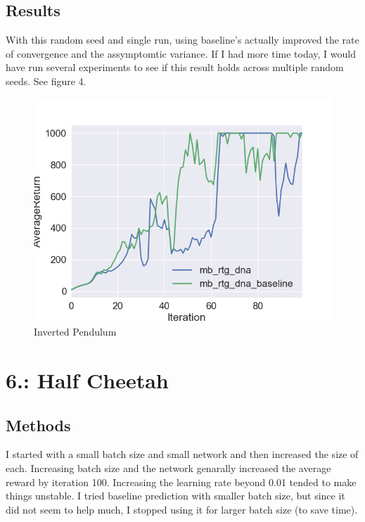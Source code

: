 \documentclass{article}\usepackage[]{graphicx}\usepackage[]{color}
\begin{document}
\subsection*{Results}

With this random seed and single run, using baseline's actually improved the rate of convergence and the assymptomtic variance. If I had more time today, I would have run several experiments to see if this result holds across multiple random seeds. See figure 4.

\begin{figure}
  \includegraphics[width=\linewidth]{figures/inverted_pendulum_baseline_exp.png}
  \caption{Inverted Pendulum}
  \label{pendulumas}
\end{figure}

\section*{6.: Half Cheetah}

\subsection*{Methods}

I started with a small batch size and small network and then increased the size of each. Increasing batch size and the network genarally increased the average reward by iteration 100. Increasing the learning rate beyond 0.01 tended to make things unstable. I tried baseline prediction with smaller batch size, but since it did not seem to help much, I stopped using it for larger batch size (to save time). 
\end{document}
